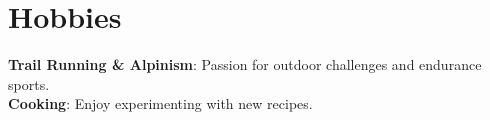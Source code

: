 \documentclass[letterpaper,11pt]{article}
\begin{document}
\section{Hobbies}
 \begin{itemize}[leftmargin=0.15in, label={}]
    \small{\item{
     \textbf{Trail Running \& Alpinism}{: Passion for outdoor challenges and endurance sports.} \\
      \textbf{Cooking}{: Enjoy experimenting with new recipes.} }}
 \end{itemize}


\end{document}
